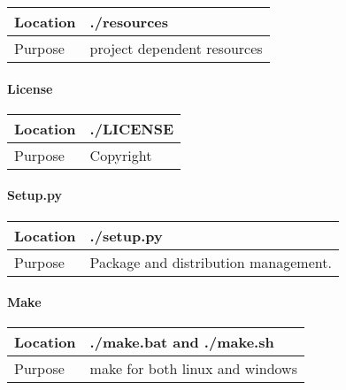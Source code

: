 \documentclass[letterpaper,10pt,english]{sphinxmanual}
\begin{document}
\begin{savenotes}\sphinxattablestart
\centering
\begin{tabulary}{\linewidth}[t]{|T|T|}
\hline

Location
&
./resources
\\
\hline
Purpose
&
project dependent resources
\\
\hline
\end{tabulary}
\par
\sphinxattableend\end{savenotes}


\paragraph{License}
\label{\detokenize{structure:license}}

\begin{savenotes}\sphinxattablestart
\centering
\begin{tabulary}{\linewidth}[t]{|T|T|}
\hline

Location
&
./LICENSE
\\
\hline
Purpose
&
Copyright
\\
\hline
\end{tabulary}
\par
\sphinxattableend\end{savenotes}


\paragraph{Setup.py}
\label{\detokenize{structure:setup-py}}

\begin{savenotes}\sphinxattablestart
\centering
\begin{tabulary}{\linewidth}[t]{|T|T|}
\hline

Location
&
./setup.py
\\
\hline
Purpose
&
Package and distribution management.
\\
\hline
\end{tabulary}
\par
\sphinxattableend\end{savenotes}


\paragraph{Make}
\label{\detokenize{structure:make}}

\begin{savenotes}\sphinxattablestart
\centering
\begin{tabulary}{\linewidth}[t]{|T|T|}
\hline

Location
&
./make.bat and ./make.sh
\\
\hline
Purpose
&
make for both linux and windows
\\
\hline
\end{tabulary}
\par
\sphinxattableend\end{savenotes}
\end{document}
